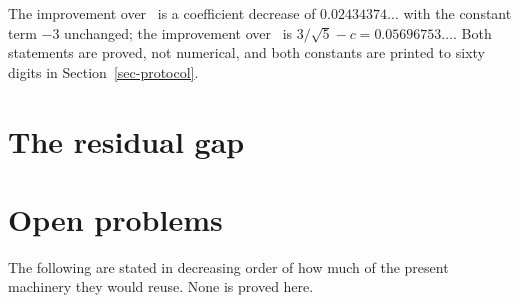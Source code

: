 The improvement over~\cite[Proposition 6.1]{STW} is a coefficient decrease
of $0.02434374\ldots$ with the constant term $-3$ unchanged; the improvement
over~\cite[Theorem 3.4.1]{Ebrahimi} is $3/\sqrt5-c=0.05696753\ldots$. Both
statements are proved, not numerical, and both constants are printed to sixty
digits in Section~\ref{sec-protocol}.

\section{The residual gap}


\section{Open problems}\label{sec-open}
The following are stated in decreasing order of how much of the present
machinery they would reuse. None is proved here.


